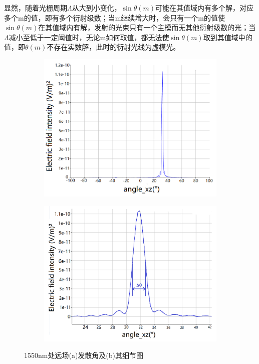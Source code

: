 \documentclass[UTF8,a4paper,12pt]{ctexart}
\numberwithin{equation}{section}
\begin{document}
显然，随着光栅周期$\Lambda$从大到小变化，$\sin{\theta(m)}$可能在其值域内有多个解，对应多个m的值，即有多个衍射级数；当m继续增大时，会只有一个m的值使$\sin{\theta(m)}$在其值域内有解，发射的光束只有一个主模而无其他衍射级数的光；当$\Lambda$减小至低于一定阈值时，无论m如何取值，都无法使$\sin{\theta(m)}$取到其值域中的值，即$\theta(m)$不存在实数解，此时的衍射光线为虚模光。
\begin{figure}[htbp]
\centering
\vspace{-0.5cm} 
\begin{subfigure}[b]{0.49\textwidth}
\centering
\includegraphics[width=\textwidth]{fig19.png}
\subcaption{}
\end{subfigure}%
\hfill
\begin{subfigure}[b]{0.49\textwidth}
\centering
\includegraphics[width=\textwidth]{fig20.png}
\subcaption{}
\end{subfigure}%
\caption{1550nm处远场(a)发散角及(b)其细节图}
\label{3-12}
\end{figure}
\end{document}
